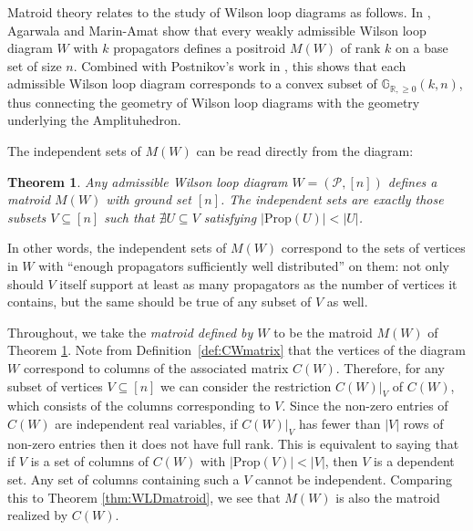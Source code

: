 \documentclass[11pt]{article}
\newcommand{\R}{\mathbb{R}}
\newcommand{\Gr}{\mathbb{G}_{\R, \geq 0}}
\newcommand{\cP}{\mathcal{P}}
\newcommand{\Prop}{\textrm{Prop}}
\newtheorem{thm}{Theorem}[section]
\theoremstyle{remark}
\theoremstyle{definition}
\begin{document}
Matroid theory relates to the study of Wilson loop diagrams as follows. In \cite{wilsonloop}, Agarwala and Marin-Amat show that every weakly admissible Wilson loop diagram $W$ with $k$ propagators defines a positroid $M(W)$ of rank $k$ on a base set of size $n$. Combined with Postnikov's work in \cite{Postnikov}, this shows that each admissible Wilson loop diagram corresponds to a convex subset of $\Gr(k,n)$, thus connecting the geometry of Wilson loop diagrams with the geometry underlying the Amplituhedron. 

The independent sets of $M(W)$ can be read directly from the diagram:

\begin{thm} \label{thm WLD defines matroid} \cite[Theorem 3.6]{wilsonloop} Any admissible Wilson loop diagram $W =(\cP, [n])$ defines a matroid $M(W)$ with ground set $[n]$. The independent sets are exactly those subsets $V \subseteq [n]$ such that $\nexists U\subseteq V$ satisfying $|\Prop(U)| < |U|$. \label{thm:WLDmatroid}\end{thm}
In other words, the independent sets of $M(W)$ correspond to the sets of vertices in $W$ with ``enough propagators sufficiently well distributed'' on them: not only should $V$ itself support at least as many propagators as the number of vertices it contains, but the same should be true of any subset of $V$ as well.

Throughout, we take the {\em matroid defined by $W$} to be the matroid $M(W)$ of Theorem \ref{thm WLD defines matroid}. Note from Definition~\ref{def:CWmatrix} that the vertices of the diagram $W$ correspond to columns of the associated matrix $C(W)$. Therefore, for any subset of vertices $V \subseteq [n]$ we can consider the restriction $C(W)|_V$ of $C(W)$, which consists of the columns corresponding to $V$. Since the non-zero entries of $C(W)$ are independent real variables, if $C(W)|_V$ has fewer than $|V|$ rows of non-zero entries then it does not have full rank. This is equivalent to saying that if $V$ is a set of columns of $C(W)$ with $|\Prop(V)| < |V|$, then $V$ is a dependent set. Any set of columns containing such a $V$ cannot be independent. Comparing this to Theorem \ref{thm:WLDmatroid}, we see that $M(W)$ is also the matroid realized by $C(W)$. 


\end{document}
